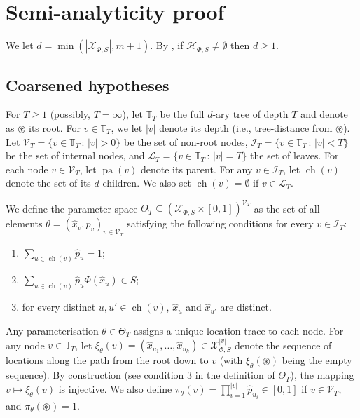 \documentclass[10pt, a4paper]{article}
\newcommand{\Ell}{\mathcal L}
\newcommand{\Hh}{\mathcal H}
\newcommand{\HhP}{\Hh_{\Phi,S}}
\newcommand{\I}{\mathcal I}
\newcommand{\ROOT}{\circledast}
\newcommand{\Tt}{\mathbb T}
\newcommand{\V}{\mathcal{V}}
\newcommand{\X}{\mathcal X}
\newcommand{\XP}{\X_{\Phi,S}}
\DeclareMathOperator{\ch}{ch}
\DeclareMathOperator{\pa}{pa}
\begin{document}
\section{Semi-analyticity proof}\label{app:coarse}
We let $d = \min(|\XP|,m+1)$. By , if $\HhP\neq\emptyset$ then  $d\geq 1$. 


\subsection{Coarsened hypotheses}
For $T\geq 1$ (possibly, $T=\infty$), let $\Tt_T$ be the full $d$-ary tree of depth $T$ and denote as $\ROOT$ its root. For $v\in\Tt_T$, we let $|v|$ denote its depth (i.e., tree-distance from $\ROOT$). Let $\V_T = \{v\in\Tt_T\,:\,|v|>0\}$ be the set of  non-root nodes, $\I_T = \{v\in\Tt_T\,:\,|v|<T\}$ be the set of internal nodes, and $\Ell_T = \{v\in\Tt_T\,:\,|v|=T\}$ the set of leaves. For each node $v \in \V_T$, let $\pa(v)$ denote its parent. For any $v\in\I_T$, let $\ch(v)$ denote the set of its $d$ children. We also set $\ch(v)=\emptyset$ if $v\in\Ell_T$.

We define the parameter space $\Theta_T \subseteq (\XP \times [0,1])^{\V_T}$ as the set of all elements $\theta = (\hat x_v, \hat p_v)_{v \in \V_T}$ satisfying the following conditions for every   $v \in \I_T$:
\begin{enumerate}
    \item $\sum_{u \in \ch(v)} \hat p_u = 1$;
    \item $\sum_{u \in \ch(v)} \hat p_u \Phi(\hat x_u) \in S$;
    \item for every distinct $u,u'\in\ch(v)$, $\hat x_u$ and $\hat x_{u'}$ are distinct. 
\end{enumerate}

Any parameterisation $\theta \in \Theta_T$ assigns a unique location trace to each node. For any node $v \in \Tt_T$, let $\xi_\theta(v) = (\hat x_{u_1}, \dots, \hat x_{u_k}) \in \XP^{|v|}$ denote the sequence of locations along the path from the root down to $v$ (with $\xi_\theta(\ROOT)$ being the empty sequence). By construction (see condition 3 in the definition of $\Theta_T$), the mapping $v\mapsto\xi_\theta(v)$ is injective. We also define $\pi_\theta(v) = \prod_{i=1}^{|v|} \hat p_{u_i}\in[0,1]$ if $v\in\V_T$, and $\pi_\theta(\ROOT) = 1$. 
\end{document}
